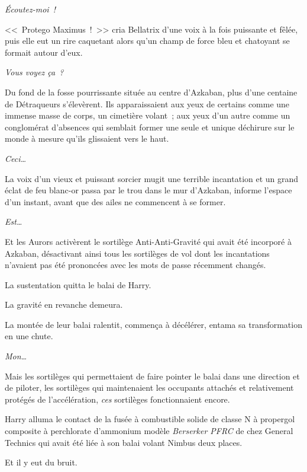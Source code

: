 \emph{Écoutez-moi~!}

<<~Protego Maximus~!~>> cria Bellatrix d'une voix à la fois puissante et fêlée, puis elle eut un rire caquetant alors qu'un champ de force bleu et chatoyant se formait autour d'eux.

\emph{Vous voyez ça~?}

Du fond de la fosse pourrissante située au centre d'Azkaban, plus d'une centaine de Détraqueurs s'élevèrent. Ils apparaissaient aux yeux de certains comme une immense masse de corps, un cimetière volant~; aux yeux d'un autre comme un conglomérat d'absences qui semblait former une seule et unique déchirure sur le monde à mesure qu'ils glissaient vers le haut.

\emph{Ceci…}

La voix d'un vieux et puissant sorcier mugit une terrible incantation et un grand éclat de feu blanc-or passa par le trou dans le mur d'Azkaban, informe l'espace d'un instant, avant que des ailes ne commencent à se former.

\emph{Est…}

Et les Aurors activèrent le sortilège Anti-Anti-Gravité qui avait été incorporé à Azkaban, désactivant ainsi tous les sortilèges de vol dont les incantations n'avaient pas été prononcées avec les mots de passe récemment changés.

La sustentation quitta le balai de Harry.

La gravité en revanche demeura.

La montée de leur balai ralentit, commença à décélérer, entama sa transformation en une chute.

\emph{Mon…}

Mais les sortilèges qui permettaient de faire pointer le balai dans une direction et de piloter, les sortilèges qui maintenaient les occupants attachés et relativement protégés de l'accélération, \emph{ces} sortilèges fonctionnaient encore.


Harry alluma le contact de la fusée à combustible solide de classe N à propergol composite à perchlorate d'ammonium modèle \emph{Berserker PFRC} de chez General Technics qui avait été liée à son balai volant Nimbus  deux places.

Et il y eut du bruit.
